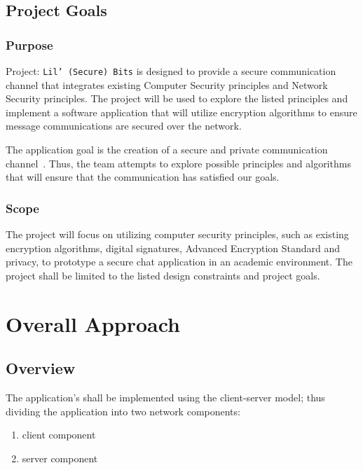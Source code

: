 \documentclass[sigconf]{acmart}
\begin{document}
\subsection{Project Goals}

\subsubsection{Purpose}
Project: \texttt{Lil' (Secure) Bits} is designed to provide a secure communication channel that
integrates existing Computer Security principles and Network Security principles. The project will
be used to explore the listed principles and implement a software application that will utilize
encryption algorithms to ensure message communications are secured over the network.

The application goal is the creation of a secure and private communication
channel~\cite{Huang:privacy}. Thus, the team attempts to explore possible
principles and algorithms that will ensure that the communication has satisfied our goals.

\subsubsection{Scope}
The project will focus on utilizing computer security principles, such as existing encryption
algorithms, digital signatures, Advanced Encryption Standard and privacy, to prototype a secure
chat application in an academic environment. The project shall be limited to the listed design
constraints and project goals.


\section{Overall Approach}

\subsection{Overview}
The application's shall be implemented using the client-server model; thus dividing the application
into two network components:
\begin{enumerate}
	\item client component
	\item server component
\end{enumerate}
\end{document}
